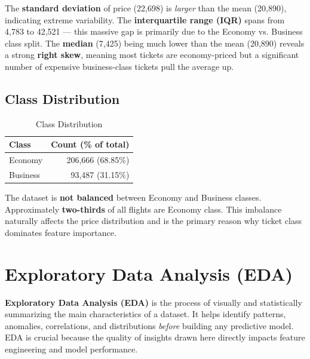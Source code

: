 \documentclass[12pt, a4paper]{article}
\newcommand{\rupee}{\text{₹}}
\begin{document}
\begin{insightbox}
The \textbf{standard deviation} of price (\rupee22,698) is \textit{larger} than the mean (\rupee20,890), indicating extreme variability. The \textbf{interquartile range (IQR)} spans from \rupee4,783 to \rupee42,521 — this massive gap is primarily due to the Economy vs. Business class split. The \textbf{median} (\rupee7,425) being much lower than the mean (\rupee20,890) reveals a strong \textbf{right skew}, meaning most tickets are economy-priced but a significant number of expensive business-class tickets pull the average up.
\end{insightbox}

\subsection{Class Distribution}

\begin{table}[H]
\centering
\caption{Class Distribution}
\begin{tabular}{lr}
\toprule
\textbf{Class} & \textbf{Count (\% of total)} \\
\midrule
Economy  & 206,666 (68.85\%) \\
Business & 93,487 (31.15\%) \\
\bottomrule
\end{tabular}
\end{table}

\begin{insightbox}
The dataset is \textbf{not balanced} between Economy and Business classes. Approximately \textbf{two-thirds} of all flights are Economy class. This imbalance naturally affects the price distribution and is the primary reason why ticket class dominates feature importance.
\end{insightbox}

\newpage

\section{Exploratory Data Analysis (EDA)}

\begin{keyterm}
\textbf{Exploratory Data Analysis (EDA)} is the process of visually and statistically summarizing the main characteristics of a dataset. It helps identify patterns, anomalies, correlations, and distributions \textit{before} building any predictive model. EDA is crucial because the quality of insights drawn here directly impacts feature engineering and model performance.
\end{keyterm}
\end{document}
